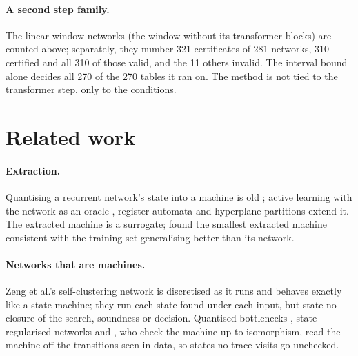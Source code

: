 \documentclass[11pt]{article}
\newcommand{\pn}[2]{#2}
\theoremstyle{definition}
\begin{document}
\paragraph{A second step family.} The linear-window networks (the window without its transformer blocks)
are counted above; separately, they number \pn{linear-jobs}{321} certificates of
\pn{linear-networks}{281} networks, \pn{linear-certified}{310} certified and all \pn{linear-valid}{310} of
those valid, and the \pn{linear-uncertified-invalid}{11} others invalid. The interval bound alone decides
all \pn{linear-bound-full}{270} of the \pn{linear-bound-tables}{270} tables it ran on. The method is not tied
to the transformer step, only to the conditions.

\section{Related work}

\paragraph{Extraction.} Quantising a recurrent network's state into a machine is old
\citep{giles-1992-learning-extracting-fsa-second-order-rnn,omlin-1996-extraction-rules-discrete-time-rnn,zeng-1993-self-clustering-recurrent-networks};
active learning with the network as an oracle
\citep{weiss-2018-extracting-automata-queries-counterexamples,mayr-2018-regular-inference-artificial-neural-networks},
register automata \citep{hong-2025-register-automata-data-sequences} and hyperplane partitions
\citep{wickramasinghe-2026-extracting-dfa-hyperplane-partitioning} extend it. The extracted machine is a
surrogate; \citet{omlin-1996-extraction-rules-discrete-time-rnn} found the smallest extracted machine
consistent with the training set generalising better than its network.

\paragraph{Networks that are machines.} Zeng et al.'s self-clustering network is discretised as it runs
and behaves exactly like a state machine; they run each state found under each input, but state no closure
of the search, soundness or decision. Quantised bottlenecks \citep{koul-2019-finite-state-recurrent-policies},
state-regularised networks \citep{wang-2019-state-regularized-rnns} and
\citet{aichernig-2024-learning-minimal-automata-rnn}, who check the machine up to isomorphism, read the
machine off the transitions seen in data, so states no trace visits go unchecked.
\end{document}
